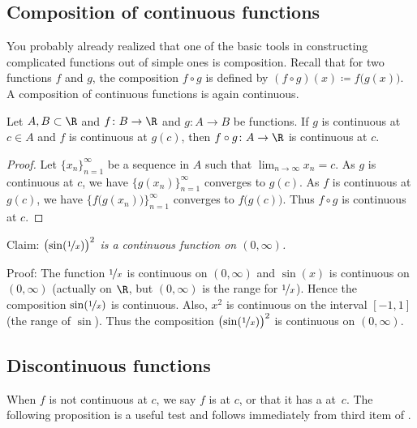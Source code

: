 \subsection{Composition of continuous functions}

You probably already realized that one of the basic tools in
constructing complicated functions out of simple ones is composition.
Recall that for two functions $f$ and $g$,
the composition $f \circ g$ is defined by
$(f \circ g)(x) \coloneqq f\bigl(g(x)\bigr)$.
A composition of
continuous functions is again
continuous.

\begin{prop} \label{prop:compositioncont}
Let $A, B \subset \R$ and $f \colon B \to \R$ and $g \colon A \to B$ be
functions.  If $g$ is continuous at $c \in A$ and
$f$ is continuous at $g(c)$, then $f \circ g \colon A \to \R$ is continuous
at $c$.
\end{prop}

\begin{proof}
Let $\{ x_n \}_{n=1}^\infty$ be a sequence in $A$ such that
$\lim_{n\to\infty} x_n = c$.
As $g$ is continuous at $c$, we have $\bigl\{ g(x_n) \bigr\}_{n=1}^\infty$ converges to $g(c)$.
As $f$ is continuous at $g(c)$, we have $\bigl\{ f\bigl(g(x_n)\bigr)
\bigr\}_{n=1}^\infty$ converges
to $f\bigl(g(c)\bigr)$.
Thus $f \circ g$ is continuous at $c$.
\end{proof}

\begin{example}
Claim: \emph{${\bigl(\sin(\nicefrac{1}{x})\bigr)}^2$ is a continuous
function on $(0,\infty)$.}

Proof: The function $\nicefrac{1}{x}$ is continuous on
$(0,\infty)$ and $\sin(x)$ is continuous on $(0,\infty)$ (actually
on $\R$, but $(0,\infty)$ is the range for $\nicefrac{1}{x}$).
Hence the composition $\sin(\nicefrac{1}{x})$ is continuous.  Also,
$x^2$ is continuous on the interval $[-1,1]$ (the range of $\sin$).  Thus
the composition
${\bigl(\sin(\nicefrac{1}{x})\bigr)}^2$ is continuous on $(0,\infty)$.
\end{example}

\subsection{Discontinuous functions}

When $f$ is not continuous at $c$, we
say $f$ is \emph{} at $c$, or that it has a
\emph{} at~$c$.
The following proposition is a useful test and follows immediately
from third item of .

